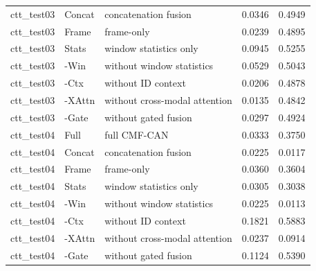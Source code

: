 \begin{tabular}{lllll}
ctt_test03 & Concat & concatenation fusion & 0.0346 & 0.4949 \\
ctt_test03 & Frame & frame-only & 0.0239 & 0.4895 \\
ctt_test03 & Stats & window statistics only & 0.0945 & 0.5255 \\
ctt_test03 & -Win & without window statistics & 0.0529 & 0.5043 \\
ctt_test03 & -Ctx & without ID context & 0.0206 & 0.4878 \\
ctt_test03 & -XAttn & without cross-modal attention & 0.0135 & 0.4842 \\
ctt_test03 & -Gate & without gated fusion & 0.0297 & 0.4924 \\
ctt_test04 & Full & full CMF-CAN & 0.0333 & 0.3750 \\
ctt_test04 & Concat & concatenation fusion & 0.0225 & 0.0117 \\
ctt_test04 & Frame & frame-only & 0.0360 & 0.3604 \\
ctt_test04 & Stats & window statistics only & 0.0305 & 0.3038 \\
ctt_test04 & -Win & without window statistics & 0.0225 & 0.0113 \\
ctt_test04 & -Ctx & without ID context & 0.1821 & 0.5883 \\
ctt_test04 & -XAttn & without cross-modal attention & 0.0237 & 0.0914 \\
ctt_test04 & -Gate & without gated fusion & 0.1124 & 0.5390 \\
\bottomrule
\end{tabular}
